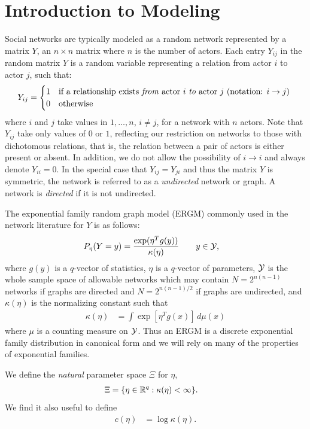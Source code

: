 \section{Introduction to Modeling}
Social networks are typically modeled as a random network represented by a matrix $Y$, an $n \times n$ matrix where $n$ is the number of actors.
Each entry $Y_{ij}$ in the random matrix $Y$ is a random variable representing a relation from actor $i$ to actor $j$, such that:
\[
	Y_{ij} = 
	\begin{cases}
		1 & \text{if a relationship exists \textit{from} actor $i$ \textit{to} actor $j$ (notation: $i \to j$)}\\
		0 & \text{otherwise}
	\end{cases}
	\
\]
where $i$ and $j$ take values in $1, \ldots, n$, $i \neq j$, for a network with $n$ actors.  Note that $Y_{ij}$ take only values of $0$ or $1$, reflecting our restriction on networks to those with dichotomous relations, that is, the relation between a pair of actors is either present or absent.  In addition, we do not allow the possibility of $i \to i$ and always denote $Y_{ii} = 0$.  In the special case that $Y_{ij} = Y_{ji}$ and thus the matrix $Y$ is symmetric, the network is referred to as a \textit{undirected} network or graph.  A network is \textit{directed} if it is not undirected.  

The exponential family random graph model (ERGM) commonly used in the network literature for $Y$ is as follows:
\begin{align}
	P_{\eta}(Y=y) &= \frac{ \exp(\eta^T g(y) ) }{ \kappa( \eta) } \qquad y \in {\mathcal Y}, \label{E:ERGM}
\end{align}
where $g(y)$ is a $q$-vector of statistics, $\eta$ is a $q$-vector of parameters, ${\mathcal Y}$ is the whole sample space of allowable networks which may contain $N = 2^{n(n-1)}$ networks if graphs are directed and $N = 2^{n(n-1)/2}$ if graphs are undirected, and $\kappa(\eta)$ is the normalizing constant such that
\begin{align*}
   \kappa(\eta) &= \int \exp [ \eta^T g(x) ] \, d \mu(x) %
\end{align*}
where $\mu$ is a counting measure on ${\mathcal Y}$.  Thus an ERGM is a discrete exponential family distribution in canonical form \citep{tpe} and we will rely on many of the properties of exponential families.

We define the \textit{natural} parameter space $\Xi$ for $\eta$,
\begin{align}
   \Xi &= \{ \eta \in {\mathbb R}^q : \kappa(\eta) < \infty \}.  \label{E:paramspace}
\end{align}
We find it also useful to define
\begin{align*}
	c(\eta) &= \log \kappa(\eta).
\end{align*}


